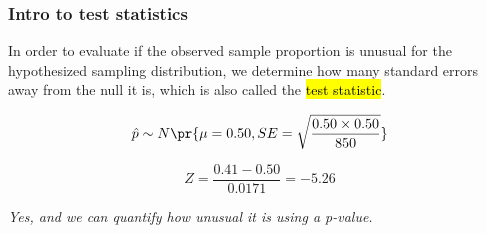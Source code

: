\documentclass[t,compress,mathserif]{beamer}
\newcommand{\soln}[1]{\textit{#1}}
\begin{document}
\begin{frame}
\frametitle{Intro to test statistics}

In order to evaluate if the observed sample proportion is unusual for the hypothesized sampling distribution, we determine how many standard errors away from the null it is, which is also called the \hl{test statistic}.

\pause

\[ \hat{p} \sim N \pr{ \mu = 0.50, SE = \sqrt{\frac{0.50 \times 0.50}{850} }  } \]

\pause

\[ Z = \frac{0.41 - 0.50}{0.0171} = -5.26 \]

 \pause


\pause

\soln{Yes, and we can quantify how unusual it is using a p-value.}

\end{frame}



\end{document}
